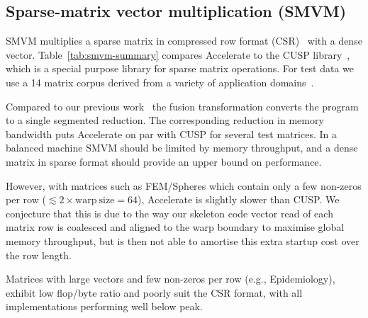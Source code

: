 \subsection{Sparse-matrix vector multiplication (SMVM)}
SMVM multiplies a sparse matrix in compressed row format (CSR)~\cite{Chatterjee:1990vj} with a dense vector. Table~\ref{tab:smvm-summary} compares Accelerate to the CUSP library~\cite{Bell:2009}, which is a special purpose library for sparse matrix operations. For test data we use a 14 matrix corpus derived from a variety of application domains~\cite{Williams:2009}.


Compared to our previous work~\cite{Chakravarty:Accelerate} the fusion transformation converts the program to a single segmented reduction. The corresponding reduction in memory bandwidth puts Accelerate on par with CUSP for several test matrices. In a balanced machine SMVM should be limited by memory throughput, and a dense matrix in
sparse format should provide an upper bound on performance. 



However, with matrices such as FEM/Spheres which contain only a few non-zeros per row ($\lesssim 2 \times \mathrm{warp\ size} = 64$), Accelerate is slightly slower than CUSP. We conjecture that this is due to the way our skeleton code vector read of each matrix row is coalesced and aligned to the warp boundary to maximise global memory throughput, but is then not able to amortise this extra startup cost over the row length. 

Matrices with large vectors and few non-zeros per row (e.g., Epidemiology), exhibit low flop/byte ratio and poorly suit the CSR format, with all implementations performing well below peak. 


